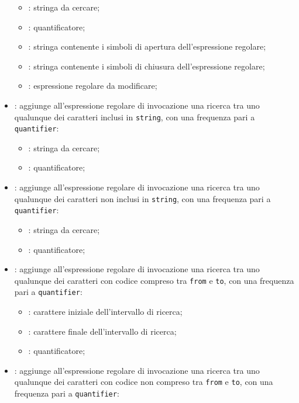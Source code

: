 \begin{itemize}
\begin{itemize}
		\item {}: stringa da cercare;
		\item {}: quantificatore;
		\item {}: stringa contenente i simboli di apertura dell'espressione regolare;
		\item {}: stringa contenente i simboli di chiusura dell'espressione regolare;
		\item {}: espressione regolare da modificare;
	\end{itemize}
	\item {}: aggiunge all'espressione regolare di invocazione una ricerca tra uno qualunque dei caratteri inclusi in \texttt{string}, con una frequenza pari a \texttt{quantifier}:
	\begin{itemize}
		\item {}: stringa da cercare;
		\item {}: quantificatore;
	\end{itemize}
	\item {}: aggiunge all'espressione regolare di invocazione una ricerca tra uno qualunque dei caratteri non inclusi in \texttt{string}, con una frequenza pari a \texttt{quantifier}:
	\begin{itemize}
		\item {}: stringa da cercare;
		\item {}: quantificatore;
	\end{itemize}
	\item {}: aggiunge all'espressione regolare di invocazione una ricerca tra uno qualunque dei caratteri con codice compreso tra \texttt{from} e \texttt{to}, con una frequenza pari a \texttt{quantifier}:
	\begin{itemize}
		\item {}: carattere iniziale dell'intervallo di ricerca;
		\item {}: carattere finale dell'intervallo di ricerca;
		\item {}: quantificatore;
	\end{itemize}
	\item {}: aggiunge all'espressione regolare di invocazione una ricerca tra uno qualunque dei caratteri con codice non compreso tra \texttt{from} e \texttt{to}, con una frequenza pari a \texttt{quantifier}:

\end{itemize}
